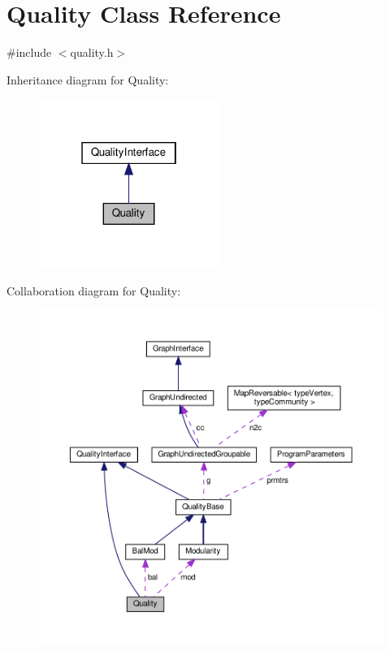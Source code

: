 \hypertarget{classQuality}{}\section{Quality Class Reference}
\label{classQuality}


{\ttfamily \#include $<$quality.\+h$>$}



Inheritance diagram for Quality\+:
\nopagebreak
\begin{figure}[H]
\begin{center}
\leavevmode
\includegraphics[width=166pt]{classQuality__inherit__graph}
\end{center}
\end{figure}


Collaboration diagram for Quality\+:
\nopagebreak
\begin{figure}[H]
\begin{center}
\leavevmode
\includegraphics[width=350pt]{classQuality__coll__graph}
\end{center}
\end{figure}
